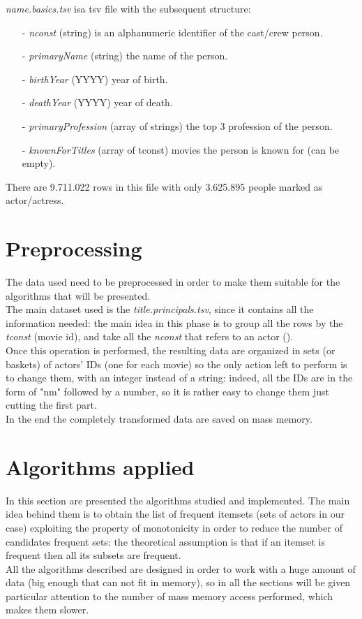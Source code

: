 \documentclass[14pt]{extarticle}
\begin{document}
\noindent
{\it name.basics.tsv} isa  tsv file with the subsequent structure:
\begin{itemize}[leftmargin=*]
\vspace{-0.4cm}\item[-]{\it nconst } (string) is an alphanumeric identifier of the cast/crew person.
\vspace{-1.1cm}\item[-]{\it primaryName } (string) the name of the person.
\vspace{-0.4cm}\item[-]{\it birthYear } (YYYY) year of birth.
\vspace{-0.4cm}\item[-]{\it deathYear  } (YYYY) year of death.
\vspace{-0.4cm}\item[-]{\it primaryProfession } (array of strings) the top 3 profession of the person.
\vspace{-1.0cm}\item[-]{\it knownForTitles  } (array of tconst) movies the person is known for (can be empty).
\end{itemize}
There are 9.711.022 rows in this file with only 3.625.895 people marked as actor/actress.
\section{Preprocessing}
The data used need to be preprocessed in order to make them suitable for the algorithms that will be presented.\\
The main dataset used is the {\it title.principals.tsv}, since it contains all the information needed: the main idea in this phase is to group all the rows by the {\it tconst} (movie id), and take all the {\it nconst} that refers to an actor ({\itcategory}).\\
Once this operation is performed, the resulting data are organized in sets (or baskets) of actors' IDs (one for each movie) so the only action left to perform is to change them, with an integer instead of a string: indeed, all the IDs are in the form of "nm" followed by a number, so it is rather easy to change them just cutting the first part.\\
In the end the completely transformed data are saved on mass memory.\\

\section{Algorithms applied}
In this section are presented the algorithms studied and implemented. The main idea behind them is to obtain the list of frequent itemsets (sets of actors in our case) exploiting the property of monotonicity in order to reduce  the number of candidates frequent sets: the theoretical assumption is that if an itemset is frequent then all its subsets are frequent.\\
All the algorithms described are designed in order to work with a huge amount of data (big enough that can not fit in memory), so in all the sections will be given particular attention to the number of mass memory access performed, which makes them slower.
\end{document}
